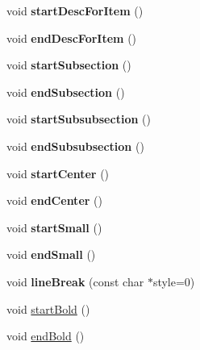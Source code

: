 \begin{DoxyCompactItemize}
void {\bfseries start\+Desc\+For\+Item} ()
\item 
\mbox{\label{class_output_list_a5e1d56ddf6a6238a4e1b8733d057c782}} 
void {\bfseries end\+Desc\+For\+Item} ()
\item 
\mbox{\label{class_output_list_ad4ec0814711cb2928d9a32aa69d980d1}} 
void {\bfseries start\+Subsection} ()
\item 
\mbox{\label{class_output_list_a23eb35221592612198b556c577ffe619}} 
void {\bfseries end\+Subsection} ()
\item 
\mbox{\label{class_output_list_af8eba8c14941c51616d949a618516ff4}} 
void {\bfseries start\+Subsubsection} ()
\item 
\mbox{\label{class_output_list_a828e83dee7bf45ee04493942d9dd803b}} 
void {\bfseries end\+Subsubsection} ()
\item 
\mbox{\label{class_output_list_acc709b251fc97e9e5c7d3d205ffb0a5e}} 
void {\bfseries start\+Center} ()
\item 
\mbox{\label{class_output_list_ad71b2d5a74052d9539968a25e7d86bb0}} 
void {\bfseries end\+Center} ()
\item 
\mbox{\label{class_output_list_acf8ce762c6c7838d86ad132f20a2306a}} 
void {\bfseries start\+Small} ()
\item 
\mbox{\label{class_output_list_a8142de5d17dd16fce39b80c0dfc3dfe2}} 
void {\bfseries end\+Small} ()
\item 
\mbox{\label{class_output_list_a492a56a47cd88f46dfc05279a692159e}} 
void {\bfseries line\+Break} (const char $\ast$style=0)
\item 
void \mbox{\hyperlink{class_output_list_a796018ee85949771252f36fea9a288d0}{start\+Bold}} ()
\item 
void \mbox{\hyperlink{class_output_list_aa3f855a4e60d2a7c6769b66d43c69b23}{end\+Bold}} ()
\item 
\mbox{\label{class_output_list_a2b1f20b3f47c99449bb03c41e1b00fe8}} 

\end{DoxyCompactItemize}
